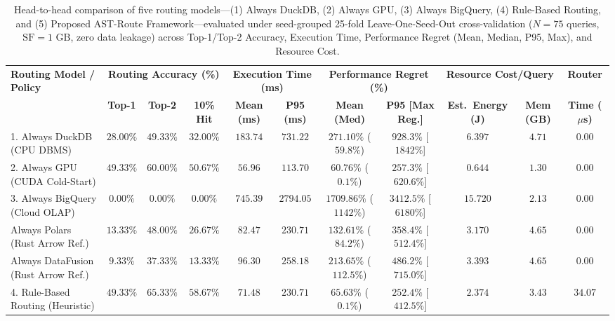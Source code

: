 \documentclass[10pt,a4paper]{article}
\begin{document}
\begin{table}[!t]
\centering
\caption{Head-to-head comparison of five routing models---(1) Always DuckDB, (2) Always GPU, (3) Always BigQuery, (4) Rule-Based Routing, and (5) Proposed AST-Route Framework---evaluated under seed-grouped 25-fold Leave-One-Seed-Out cross-validation ($N=75$ queries, $\text{SF}=1\text{ GB}$, zero data leakage) across Top-1/Top-2 Accuracy, Execution Time, Performance Regret (Mean, Median, P95, Max), and Resource Cost.}
\label{tab:routing_evaluation}\label{tab:query_routing}\label{tab:router_eval}
\scriptsize
\setlength{\tabcolsep}{3.2pt}
\renewcommand{\arraystretch}{1.12}
\begin{tabular}{@{}lcccccccccc@{}}
\toprule
\multirow{2}{*}{\textbf{Routing Model / Policy}} & \multicolumn{3}{c}{\textbf{Routing Accuracy (\%)}} & \multicolumn{2}{c}{\textbf{Execution Time (ms)}} & \multicolumn{2}{c}{\textbf{Performance Regret (\%)}} & \multicolumn{2}{c}{\textbf{Resource Cost/Query}} & \textbf{Router} \\
\cmidrule(lr){2-4} \cmidrule(lr){5-6} \cmidrule(lr){7-8} \cmidrule(lr){9-10} \cmidrule(lr){11-11}
 & \textbf{Top-1} & \textbf{Top-2} & \textbf{10\% Hit} & \textbf{Mean (ms)} & \textbf{P95 (ms)} & \textbf{Mean (Med)} & \textbf{P95 [Max Reg.]} & \textbf{Est.\ Energy (J)} & \textbf{Mem (GB)} & \textbf{Time ($\mu$s)} \\
\midrule
1. Always DuckDB (CPU DBMS) & $28.00\%$ & $49.33\%$ & $32.00\%$ & $183.74$ & $731.22$ & $271.10\%$ ($59.8\%$) & $928.3\%$ [$1842\%$] & $6.397$ & $4.71$ & $0.00$ \\
2. Always GPU (CUDA Cold-Start) & $49.33\%$ & $60.00\%$ & $50.67\%$ & $56.96$ & $113.70$ & $60.76\%$ ($0.1\%$) & $257.3\%$ [$620.6\%$] & $0.644$ & $1.30$ & $0.00$ \\
3. Always BigQuery (Cloud OLAP) & $0.00\%$ & $0.00\%$ & $0.00\%$ & $745.39$ & $2794.05$ & $1709.86\%$ ($1142\%$) & $3412.5\%$ [$6180\%$] & $15.720$ & $2.13$ & $0.00$ \\
Always Polars (Rust Arrow Ref.) & $13.33\%$ & $48.00\%$ & $26.67\%$ & $82.47$ & $230.71$ & $132.61\%$ ($84.2\%$) & $358.4\%$ [$512.4\%$] & $3.170$ & $4.65$ & $0.00$ \\
Always DataFusion (Rust Arrow Ref.) & $9.33\%$ & $37.33\%$ & $13.33\%$ & $96.30$ & $258.18$ & $213.65\%$ ($112.5\%$) & $486.2\%$ [$715.0\%$] & $3.393$ & $4.65$ & $0.00$ \\
4. Rule-Based Routing (Heuristic) & $49.33\%$ & $65.33\%$ & $58.67\%$ & $71.48$ & $230.71$ & $65.63\%$ ($0.1\%$) & $252.4\%$ [$412.5\%$] & $2.374$ & $3.43$ & $34.07$ \\

\end{tabular}
\end{table}
\end{document}
